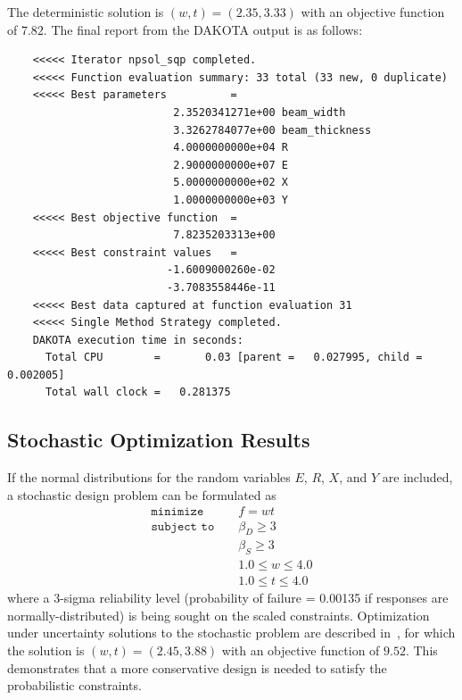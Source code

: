The deterministic solution is $(w,t)=(2.35,3.33)$ with an objective
function of $7.82$. The final report from the DAKOTA output is as
follows:
\begin{small}
\begin{verbatim}
    <<<<< Iterator npsol_sqp completed.
    <<<<< Function evaluation summary: 33 total (33 new, 0 duplicate)
    <<<<< Best parameters          =
                          2.3520341271e+00 beam_width
                          3.3262784077e+00 beam_thickness
                          4.0000000000e+04 R
                          2.9000000000e+07 E
                          5.0000000000e+02 X
                          1.0000000000e+03 Y
    <<<<< Best objective function  =
                          7.8235203313e+00
    <<<<< Best constraint values   =
                         -1.6009000260e-02
                         -3.7083558446e-11
    <<<<< Best data captured at function evaluation 31
    <<<<< Single Method Strategy completed.
    DAKOTA execution time in seconds:
      Total CPU        =       0.03 [parent =   0.027995, child =   0.002005]
      Total wall clock =   0.281375
\end{verbatim}
\end{small}

\subsection{Stochastic Optimization Results}\label{additional:cantilever:stochastic}

If the normal distributions for the random variables $E$, $R$, $X$,
and $Y$ are included, a stochastic design problem can be formulated as
\begin{eqnarray}
\texttt{minimize }   & & f = w t            \nonumber\\
\texttt{subject to } & & \beta_{D} \geq 3   \label{additional:cantouu}\\
                     & & \beta_{S} \geq 3   \nonumber\\
                     & & 1.0 \leq w \leq 4.0\nonumber\\
                     & & 1.0 \leq t \leq 4.0\nonumber
\end{eqnarray}
where a 3-sigma reliability level (probability of failure = 0.00135 if
responses are normally-distributed) is being sought on the scaled
constraints. Optimization under uncertainty solutions to the
stochastic problem are described in~\cite{Eld02,Eld05,Eld06a}, for
which the solution is $(w,t)=(2.45,3.88)$ with an objective function
of $9.52$.  This demonstrates that a more conservative design is
needed to satisfy the probabilistic constraints.

